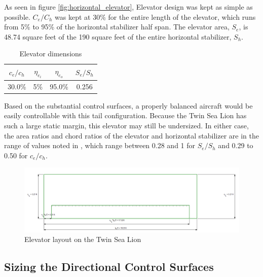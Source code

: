 \documentclass[conf]{new-aiaa}
\begin{document}
As seen in figure \ref{fig:horizontal_elevator}, Elevator design was kept as simple as possible. $C_e/C_h$ was kept at 30\% for the entire length of the elevator, which runs from 5\% to 95\% of the horizontal stabilizer half span. The elevator area, $S_e$, is 48.74 square feet of the 190 square feet of the entire horizontal stabilizer, $S_h$.

\begin{table}[H]
\centering
\caption{Elevator dimensions}
\begin{tabular}{|c|c|c|c|}\hline
    $c_e/c_h$ & $\eta_{e_i}$ & $\eta_{e_o}$ & $S_e/S_h$ \\ \hline
    30.0\%    & 5\%          & 95.0\%       & 0.256     \\ \hline
\end{tabular}
\label{tab:elevator_size_table}
\end{table}

Based on the substantial control surfaces, a properly balanced aircraft would 
be easily controllable with this tail configuration. Because the Twin Sea Lion has 
such a large static margin, this elevator may still be undersized. In either case, 
the area ratios and chord ratios of the elevator and horizontal stabilizer are in 
the range of values noted in \cite{orange_book}, which range between 0.28 and 1 for $S_e/S_h$ and 0.29 to 0.50 for $c_e/c_h$.

\begin{figure}[H]
    \includegraphics[width=\textwidth]{Report3Printouts/Empannage/Horizontal_elevator_plot.png}
    \caption{Elevator layout on the Twin Sea Lion}
    \label{fig:horizontal_elevator_plot}
\end{figure}

\subsection{Sizing the Directional Control Surfaces}
\end{document}
